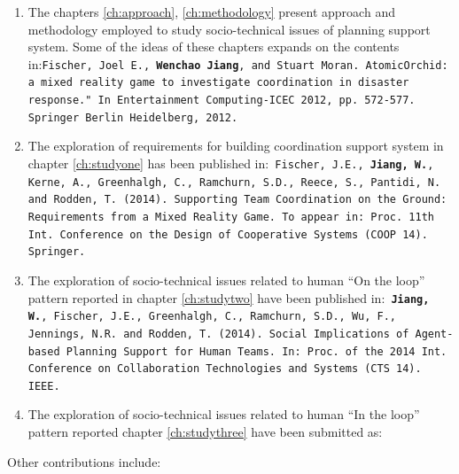 \begin{enumerate}
\item The chapters \ref{ch:approach}, \ref{ch:methodology}  present approach and methodology employed to study socio-technical issues of planning support system. Some of the ideas of these chapters expands on the contents in:\texttt{Fischer, Joel E., \textbf{Wenchao Jiang}, and Stuart Moran. AtomicOrchid: a mixed reality game to investigate coordination in disaster response." In Entertainment Computing-ICEC 2012, pp. 572-577. Springer Berlin Heidelberg, 2012.}\\

\item The exploration of requirements for building coordination support system in chapter \ref{ch:studyone}  has been published in:\texttt{ Fischer, J.E., \textbf{Jiang, W.}, Kerne, A., Greenhalgh, C., Ramchurn, S.D., Reece, S., Pantidi, N. and Rodden, T. (2014). Supporting Team Coordination on the Ground: Requirements from a Mixed Reality Game. To appear in: Proc. 11th Int. Conference on the Design of Cooperative Systems (COOP 14). Springer.}\\


\item The exploration of socio-technical issues related to human ``On the loop'' pattern reported in chapter \ref{ch:studytwo} have been published in:\texttt{ \textbf{Jiang, W.}, Fischer, J.E., Greenhalgh, C., Ramchurn, S.D., Wu, F., Jennings, N.R. and Rodden, T. (2014). Social Implications of Agent-based Planning Support for Human Teams.  In: Proc. of the 2014 Int. Conference on Collaboration Technologies and Systems (CTS 14). IEEE.}

\item The exploration of socio-technical issues related to human ``In the loop'' pattern reported chapter \ref{ch:studythree} have been submitted as:\\



\end{enumerate}

Other contributions include:

